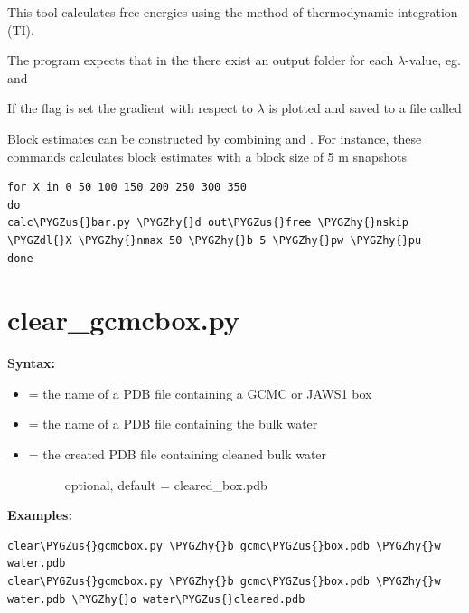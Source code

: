 \documentclass[letterpaper,10pt,english]{sphinxmanual}
\def\PYGZus{\char`\_}
\def\PYGZdl{\char`\$}
\def\PYGZhy{\char`\-}
\begin{document}
This tool calculates free energies using the method of thermodynamic integration (TI).

The program expects that in the  there exist an output folder for each \(\lambda\)-value, eg.  and 

If the  flag is set the gradient with respect to \(\lambda\) is plotted and saved to a file called 

Block estimates can be constructed by combining  and . For instance, these commands calculates block estimates with a block size of 5 m snapshots

\begin{Verbatim}[commandchars=\\\{\}]
for X in 0 50 100 150 200 250 300 350
do
calc\PYGZus{}bar.py \PYGZhy{}d out\PYGZus{}free \PYGZhy{}nskip \PYGZdl{}X \PYGZhy{}nmax 50 \PYGZhy{}b 5 \PYGZhy{}pw \PYGZhy{}pu
done
\end{Verbatim}


\section{clear\_gcmcbox.py}
\label{tools:clear-gcmcbox-py}
\textbf{Syntax:}

\begin{itemize}
\item {} 
 = the name of a PDB file containing a GCMC or JAWS1 box

\item {} 
 = the name of a PDB file containing the bulk water

\item {} \begin{description}
\item[{ = the created PDB file containing cleaned bulk water}] \leavevmode
optional, default = cleared\_box.pdb

\end{description}

\end{itemize}

\textbf{Examples:}

\begin{Verbatim}[commandchars=\\\{\}]
clear\PYGZus{}gcmcbox.py \PYGZhy{}b gcmc\PYGZus{}box.pdb \PYGZhy{}w water.pdb
clear\PYGZus{}gcmcbox.py \PYGZhy{}b gcmc\PYGZus{}box.pdb \PYGZhy{}w water.pdb \PYGZhy{}o water\PYGZus{}cleared.pdb
\end{Verbatim}
\end{document}
